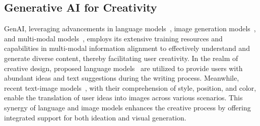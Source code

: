 \subsection{Generative AI for Creativity}
GenAI, leveraging advancements in language models~\cite{Radford:2018:gpt2, Radford:2019:gpt2}, image generation models~\cite{Kingma:2022:vae, Goodfellow:2020:gan}, and multi-modal models~\cite{Radford:2021:clip, Li:2022:blip, Rombach:2022:stablediffusion}, employs its extensive training resources and capabilities in multi-modal information alignment to effectively understand and generate diverse content, thereby facilitating user creativity. In the realm of creative design, proposed language models~\cite{Swanson:2021:story}  are utilized to provide users with abundant ideas and text suggestions during the writing process. Meanwhile, recent text-image models~\cite{Chung:2024:styleid, Zhang:2023:inst, Chen:2024:democaricature, Zhang:2023:prospect}, with their comprehension of style, position, and color, enable the translation of user ideas into images across various scenarios. This synergy of language and image models enhances the creative process by offering integrated support for both ideation and visual generation.






